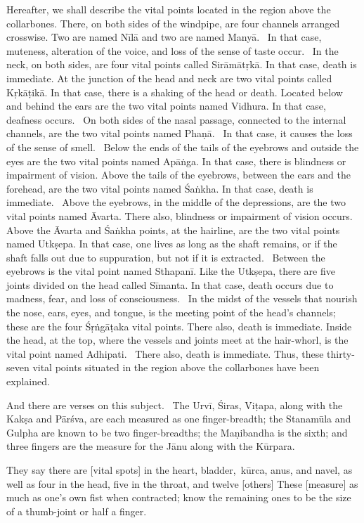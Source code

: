 \begin{translation}
\begin{tt}
Hereafter, we shall describe the vital points located in the region above the collarbones.
There, on both sides of the windpipe, are four channels arranged crosswise.
Two are named Nīlā and two are named Manyā. 
In that case, muteness, alteration of the voice, and loss of the sense of taste occur. 
In the neck, on both sides, are four vital points called Sirāmātṛkā.
In that case, death is immediate.
At the junction of the head and neck are two vital points called Kṛkāṭikā.
In that case, there is a shaking of the head or death.
Located below and behind the ears are the two vital points named Vidhura.
In that case, deafness occurs. 
On both sides of the nasal passage, connected to the internal channels, are the two vital points named Phaṇā. 
In that case, it causes the loss of the sense of smell. 
Below the ends of the tails of the eyebrows and outside the eyes are the two vital points named Apāṅga.
In that case, there is blindness or impairment of vision.
Above the tails of the eyebrows, between the ears and the forehead, are the two vital points named Śaṅkha.
In that case, death is immediate. 
Above the eyebrows, in the middle of the depressions, are the two vital points named Āvarta.
There also, blindness or impairment of vision occurs. 
Above the Āvarta and Śaṅkha points, at the hairline, are the two vital points named Utkṣepa.
In that case, one lives as long as the shaft remains, or if the shaft falls out due to suppuration, but not if it is extracted. 
Between the eyebrows is the vital point named Sthapanī.
Like the Utkṣepa, there are five joints divided on the head called Sīmanta.
In that case, death occurs due to madness, fear, and loss of consciousness. 
In the midst of the vessels that nourish the nose, ears, eyes, and tongue, is the meeting point of the head's channels; these are the four Śṛṅgāṭaka vital points.
There also, death is immediate.
Inside the head, at the top, where the vessels and joints meet at the hair-whorl, is the vital point named Adhipati. 
There also, death is immediate.
Thus, these thirty-seven vital points situated in the region above the collarbones have been explained.


\item[28]
And there are verses on this subject. 
The Urvī, Śiras, Viṭapa, along with the Kakṣa and Pārśva, are each measured as one finger-breadth; the Stanamūla and Gulpha are known to be two finger-breadths; the Maṇibandha is the sixth; and three fingers are the measure for the Jānu along with the Kūrpara.

\item[29]
They say there are [vital spots] in the heart, bladder, kūrca, anus, and navel, as well as four in the head, five in the throat, and twelve [others] These [measure] as much as one's own fist when contracted; know the remaining ones to be the size of a thumb-joint or half a finger.



\end{tt}
\end{translation}
